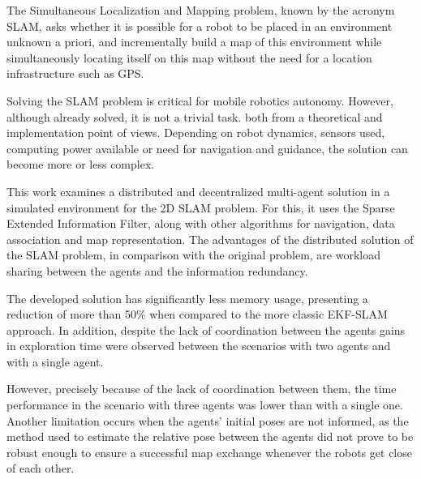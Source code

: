 The Simultaneous Localization and Mapping problem, known by the acronym SLAM, asks whether it is possible for a robot to be placed in an environment
unknown a priori, and incrementally build a map of this
environment while simultaneously locating itself on this map without the
need for a location infrastructure such as GPS.

Solving the SLAM problem is critical for mobile robotics
autonomy. However, although already solved, it is not a trivial task.
both from a theoretical and implementation point of views.
Depending on robot dynamics, sensors used, computing power available or need for navigation and guidance, the solution
can become more or less complex.

This work examines a distributed and decentralized multi-agent solution in a simulated environment
for the 2D SLAM problem. For this, it uses the Sparse Extended Information Filter, along with other algorithms for navigation,
data association and map representation. The advantages of the distributed solution of the
SLAM problem, in comparison with the original problem, are workload sharing
between the agents and the information redundancy.

The developed solution has significantly less memory usage,
presenting a reduction of more than 50\% when compared to the more classic EKF-SLAM approach.
In addition, despite the lack of coordination between the agents
gains in exploration time were observed between the scenarios with two agents and with a single agent.

However, precisely because of the lack of
coordination between them, the time performance in the scenario with
three agents was lower than with a single one. Another limitation occurs
when the agents' initial poses are not informed, as the method used to 
estimate the relative pose between the agents did not prove to be robust
enough to ensure a successful map exchange whenever the robots get close 
of each other.